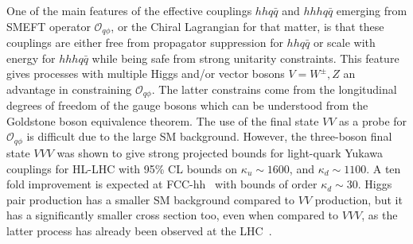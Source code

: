 One of the main features of the effective couplings $hh q\bar q$ and $hhh q\bar q$ emerging from SMEFT operator $\mathcal O_{q\phi}$, or the Chiral Lagrangian for that matter, is that these couplings are either free from propagator suppression for $hh q\bar q$ or scale with energy for $hhh q\bar q$ while being safe from strong unitarity constraints. This feature gives processes with multiple Higgs and/or vector bosons $V= W^\pm, Z$ an advantage in constraining $\mathcal O_{q\phi}$. The latter constrains come from the longitudinal degrees of freedom of the gauge bosons  which can be understood from the Goldstone boson equivalence theorem. The use of the final state $VV$ as a probe for $\mathcal O_{q\phi}$ is difficult due to the large SM background. However, the three-boson final state $VVV$ was shown to give strong projected bounds for light-quark Yukawa couplings for HL-LHC with 95\% CL bounds on $\kappa_u \sim 1600$, and $\kappa_d\sim 1100$. A ten fold improvement is expected at FCC-hh~\cite{Falkowski:2020znk} with bounds of order $\kappa_d\sim 30$. 
Higgs pair production has a smaller SM background compared to $VV$ production, but it has a significantly smaller cross section too, even when compared to $VVV$, as the latter process has already been observed at the LHC~\cite{Sciandra:2688061,CMS-PAS-SMP-19-014}.

